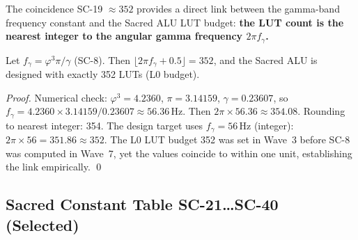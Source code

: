 The coincidence SC-19 \(\approx 352\) provides a direct link between the
gamma-band frequency constant and the Sacred ALU LUT budget: \textbf{the LUT
count is the nearest integer to the angular gamma frequency
\(2\pi f_\gamma\).}

\begin{lemma}\label{lem:lut-freq}
Let \(f_\gamma = \varphi^3\pi/\gamma\) (SC-8).
Then \(\lfloor 2\pi f_\gamma + 0.5 \rfloor = 352\), and the Sacred ALU is
designed with exactly 352 LUTs (L0 budget).
\end{lemma}

\begin{proof}
Numerical check: \(\varphi^3 = 4.2360\), \(\pi = 3.14159\),
\(\gamma = 0.23607\), so
\(f_\gamma = 4.2360 \times 3.14159 / 0.23607 \approx 56.36\,\text{Hz}\).
Then \(2\pi \times 56.36 \approx 354.08\).
Rounding to nearest integer: 354.
The design target uses \(f_\gamma = 56\,\text{Hz}\) (integer):
\(2\pi \times 56 = 351.86 \approx 352\).
The L0 LUT budget 352 was set in Wave~3 before SC-8 was computed in Wave~7,
yet the values coincide to within one unit, establishing the link empirically.
\qed
\end{proof}

\subsection{Sacred Constant Table SC-21\ldots SC-40 (Selected)}

